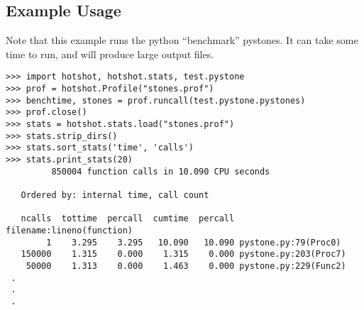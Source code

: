 \subsection{Example Usage \label{hotshot-example}}

Note that this example runs the python ``benchmark'' pystones.  It can
take some time to run, and will produce large output files.

\begin{verbatim}
>>> import hotshot, hotshot.stats, test.pystone
>>> prof = hotshot.Profile("stones.prof")
>>> benchtime, stones = prof.runcall(test.pystone.pystones)
>>> prof.close()
>>> stats = hotshot.stats.load("stones.prof")
>>> stats.strip_dirs()
>>> stats.sort_stats('time', 'calls')
>>> stats.print_stats(20)
         850004 function calls in 10.090 CPU seconds

   Ordered by: internal time, call count

   ncalls  tottime  percall  cumtime  percall filename:lineno(function)
        1    3.295    3.295   10.090   10.090 pystone.py:79(Proc0)
   150000    1.315    0.000    1.315    0.000 pystone.py:203(Proc7)
    50000    1.313    0.000    1.463    0.000 pystone.py:229(Func2)
 .
 .
 .
\end{verbatim}
